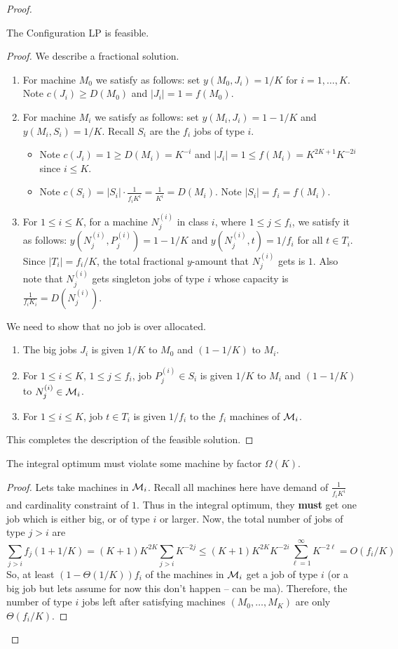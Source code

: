 \begin{proof}
	\begin{lemma}
		The Configuration LP is feasible.
	\end{lemma}
	\begin{proof}
		We describe a fractional solution.
		\begin{enumerate}
			\item For machine $M_0$ we satisfy as follows: set  $y(M_0,J_i) = 1/K$ for $i=1,\ldots,K$. Note $c(J_i) \geq D(M_0)$ and $|J_i| = 1 = f(M_0)$. 
			\item For machine $M_i$ we satisfy as follows: set $y(M_i,J_i) = 1-1/K$ and $y(M_i,S_i) = 1/K$. Recall $S_i$ are the $f_i$ jobs of type $i$. 
			\begin{itemize}
				\item Note $c(J_i) = 1 \geq D(M_i) = K^{-i}$ and 	$|J_i| = 1 \leq f(M_i) = K^{2K+1}K^{-2i}$ since $i\leq K$.
				\item Note $c(S_i) = |S_i|\cdot \frac{1}{f_iK^i} = \frac{1}{K^i} = D(M_i)$. Note $|S_i| = f_i = f(M_i)$.
			\end{itemize}
			\item For $1\leq i\leq K$, for a machine $N^{(i)}_j$ in class $i$, where $1\leq j\leq f_i$, we satisfy it as follows: $y(N^{(i)}_j, P^{(i)}_j) = 1-1/K$ and $y(N^{(i)}_j, t) = 1/f_i$ for all $t\in T_i$.
			Since $|T_i| = f_i/K$, the total fractional $y$-amount that $N^{(i)}_j$ gets is $1$. Also note that $N^{(i)}_j$ gets singleton jobs of type $i$ whose capacity is $\frac{1}{f_iK_i} = D(N^{(i)}_j)$.
		\end{enumerate}
		We need to show that no job is over allocated.
		\begin{enumerate}
			\item The big jobs $J_i$ is given $1/K$ to $M_0$ and $(1-1/K)$ to $M_i$.
			\item For $1\leq i\leq K$, $1\leq j\leq f_i$, job $P^{(i)}_j \in S_i$ is given $1/K$ to $M_i$ and $(1-1/K)$ to $N^{(i)}_j\in \mathcal{M}_i$.
			\item For $1\leq i\leq K$, job $t\in T_i$ is given $1/f_i$ to the $f_i$ machines of $\mathcal{M}_i$.
		\end{enumerate}
		This completes the description of the feasible solution.
	\end{proof}
	\begin{lemma}
		The integral optimum must violate some machine by factor $\Omega(K)$.
	\end{lemma}
	\begin{proof}
		Lets take machines in $\mathcal{M}_i$. Recall all machines here have demand of $\frac{1}{f_iK^i}$ and cardinality constraint of $1$.
		Thus in the integral optimum, they {\bf must} get one job which is either big, or of type $i$ or larger. 
		Now, the total number of jobs of type $j > i$ are 
		\[
		\sum_{j>i} f_j(1+1/K) = (K+1)K^{2K} \sum_{j > i} K^{-2j} \leq  (K+1)K^{2K}K^{-2i} \sum_{\ell=1}^\infty K^{-2\ell} = O\left(f_i/K\right)
		\]
		So, at least $(1 - \Theta(1/K))f_i$ of the machines in $\mathcal{M}_i$ get a job of type $i$ (or a big job but lets assume for now this don't happen -- can be ma).
		Therefore, the number of type $i$ jobs left after satisfying machines $(M_0,\ldots,M_K)$ are only $\Theta(f_i/K)$.
		

\end{proof}
\end{proof}
